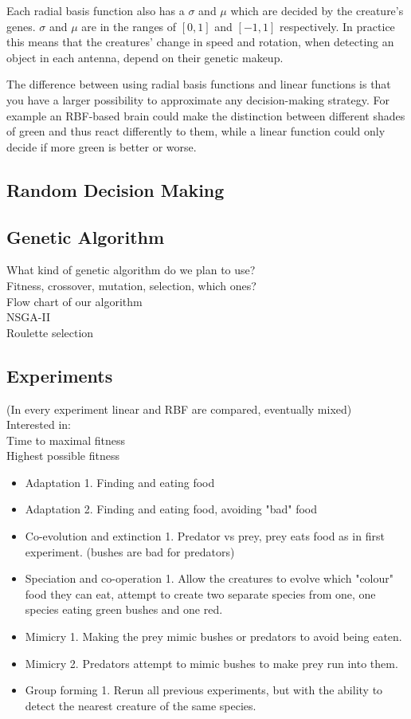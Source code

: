 \documentclass[a4paper,11pt]{kth-mag}
\begin{document}
Each radial basis function also has a $\sigma$ and $\mu$ which are decided by the creature's genes. $\sigma$ and $\mu$ are in the ranges of $[0,1]$ and $[-1,1]$ respectively. In practice this means that the creatures' change in speed and rotation, when detecting an object in each antenna, depend on their genetic makeup.

The difference between using radial basis functions and linear functions is that you have a larger possibility to approximate any decision-making strategy. For example an RBF-based brain could make the distinction between different shades of green and thus react differently to them, while a linear function could only decide if more green is better or worse.
\subsection{Random Decision Making}
\subsection{Genetic Algorithm}
What kind of genetic algorithm do we plan to use?\\
Fitness, crossover, mutation, selection, which ones?\\
Flow chart of our algorithm\\
NSGA-II\\
Roulette selection\\

\subsection{Experiments}
(In every experiment linear and RBF are compared, eventually mixed)\\
Interested in:\\
Time to maximal fitness\\
Highest possible fitness\\
\begin{itemize}
\item Adaptation 1. Finding and eating food
\item Adaptation 2. Finding and eating food, avoiding "bad" food
\item Co-evolution and extinction 1. Predator vs prey, prey eats food as in first experiment. (bushes are bad for predators)
\item Speciation and co-operation 1. Allow the creatures to evolve which "colour" food they can eat, attempt to create two separate species from one, one species eating green bushes and one red.
\item Mimicry 1. Making the prey mimic bushes or predators to avoid being eaten.
\item Mimicry 2. Predators attempt to mimic bushes to make prey run into them.
\item Group forming 1. Rerun all previous experiments, but with the ability to detect the nearest creature of the same species.
\end{itemize}
\end{document}
